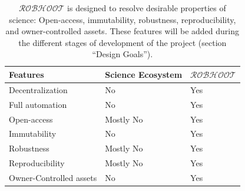 \documentclass[10pt, a4paper, twocolumn]{article} %
\begin{document}
\begin{table}
\begin{tabular}{ p{3cm} | p{2cm} | p{2cm}}
  \hline \hline
  \textbf{Features} & \textbf{Science Ecosystem} &\textbf{{\bf $\mathcal{ROBHOOT}$}}\\  \hline
  Decentralization & No & Yes \\ \hline
  Full automation & No & Yes \\ \hline
  Open-access & Mostly No & Yes \\ \hline
  Immutability & No & Yes \\ \hline
  Robustness & Mostly No & Yes \\ \hline
  Reproducibility & Mostly No & Yes \\ \hline        
  Owner-Controlled assets & No & Yes \\ \hline       
  \bottomrule
\end{tabular}
\caption{{\bf $\mathcal{ROBHOOT}$} is designed to resolve desirable
  properties of science: Open-access, immutability, robustness,
  reproducibility, and owner-controlled assets. These features will be
  added during the different stages of development of the project
  (section ``Design Goals'').}
\end{table}

\end{document}
